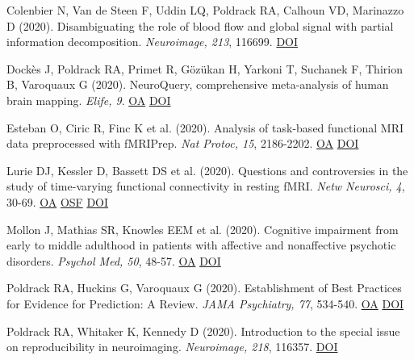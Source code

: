 \documentclass[10pt, letterpaper]{article}
\begin{document}
Colenbier N, Van de Steen F, Uddin LQ, Poldrack RA, Calhoun VD, Marinazzo D (2020). Disambiguating the role of blood flow and global signal with partial information decomposition. \textit{Neuroimage, 213}, 116699. \href{http://dx.doi.org/10.1016/j.neuroimage.2020.116699}{DOI} \vspace{2mm}

Dockès J, Poldrack RA, Primet R, Gözükan H, Yarkoni T, Suchanek F, Thirion B, Varoquaux G (2020). NeuroQuery, comprehensive meta-analysis of human brain mapping. \textit{Elife, 9}. \href{https://www.ncbi.nlm.nih.gov/pmc/articles/PMC7164961}{OA} \href{http://dx.doi.org/10.7554/elife.53385}{DOI} \vspace{2mm}

Esteban O, Ciric R, Finc K et al. (2020). Analysis of task-based functional MRI data preprocessed with fMRIPrep. \textit{Nat Protoc, 15}, 2186-2202. \href{https://www.ncbi.nlm.nih.gov/pmc/articles/PMC7404612}{OA} \href{http://dx.doi.org/10.1038/s41596-020-0327-3}{DOI} \vspace{2mm}

Lurie DJ, Kessler D, Bassett DS et al. (2020). Questions and controversies in the study of time-varying functional connectivity in resting fMRI. \textit{Netw Neurosci, 4}, 30-69. \href{https://www.ncbi.nlm.nih.gov/pmc/articles/PMC7006871}{OA} \href{https://osf.io/fa6zr/}{OSF} \href{http://dx.doi.org/10.1162/netn_a_00116}{DOI} \vspace{2mm}

Mollon J, Mathias SR, Knowles EEM et al. (2020). Cognitive impairment from early to middle adulthood in patients with affective and nonaffective psychotic disorders. \textit{Psychol Med, 50}, 48-57. \href{https://www.ncbi.nlm.nih.gov/pmc/articles/PMC7086288}{OA} \href{http://dx.doi.org/10.1017/s0033291718003938}{DOI} \vspace{2mm}

Poldrack RA, Huckins G, Varoquaux G (2020). Establishment of Best Practices for Evidence for Prediction: A Review. \textit{JAMA Psychiatry, 77}, 534-540. \href{https://www.ncbi.nlm.nih.gov/pmc/articles/PMC7250718}{OA} \href{http://dx.doi.org/10.1001/jamapsychiatry.2019.3671}{DOI} \vspace{2mm}

Poldrack RA, Whitaker K, Kennedy D (2020). Introduction to the special issue on reproducibility in neuroimaging. \textit{Neuroimage, 218}, 116357. \href{http://dx.doi.org/10.1016/j.neuroimage.2019.116357}{DOI} \vspace{2mm}
\end{document}
